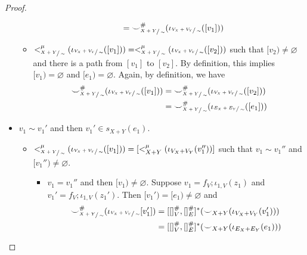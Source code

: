 \begin{proof}
\begin{itemize}
\begin{itemize}
\begin{itemize}
\begin{align*}
                                                                                                            &= {\smile}_{\sfrac{X+Y}{\sim}}^{{\#}}(\iota_{\sfrac{V_{X} + V_{Y}}{\sim}}([v_1]))
                    \end{align*}
                \end{itemize}
                \item $<_{\sfrac{X+Y}{\sim}}^{\mu}(\iota_{\sfrac{V_{X} + V_{Y}}{\sim}}([v_1])) = <_{\sfrac{X+Y}{\sim}}^{\mu}(\iota_{\sfrac{V_{X} + V_{Y}}{\sim}}([v_2]))$ such that $[v_2) \not = \varnothing$ and there is a path from $[v_1]$ to $[v_2]$. 
                By definition, this implies $[v_1) = \varnothing$ and $[e_1) = \varnothing$.
                Again, by definition, we have
                \begin{align*}
                    {\smile}_{\sfrac{X+Y}{\sim}}^{{\#}}(\iota_{\sfrac{V_{X} + V_{Y}}{\sim}}([v_1])) &= {\smile}_{\sfrac{X+Y}{\sim}}^{{\#}}(\iota_{\sfrac{V_{X} + V_{Y}}{\sim}}([v_2]))\\
                                                                                                    &= {\smile}_{\sfrac{X+Y}{\sim}}^{{\#}}(\iota_{\sfrac{E_{X} + E_{Y}}{\sim}}([e_1]))
                \end{align*}
                \end{itemize}
                \item $v_1 \sim v_1'$ and then $v_1' \in s_{X+Y}(e_1)$.
                \begin{itemize}
                    \item $<_{\sfrac{X+Y}{\sim}}^{\mu}(\iota_{\sfrac{V_{X} + V_{Y}}{\sim}}([v_1])) = [<_{X+Y}^{\mu}(\iota_{V_{X} + V_{Y}}(v_1''))]$ such that $v_1 \sim v_1''$ and $[v_1'') \not = \varnothing$.
                    \begin{itemize}
                        \item $v_1 = v_1''$ and then $[v_1) \not = \varnothing$.
                              Suppose $v_1 = f_{V};\iota_{1,V}(z_1)$ and $v_1' = f_{V};\iota_{1,V}(z_1')$. Then $[v_1') = [e_1) \not = \varnothing$ and 
                            \begin{align*}
                              \consistency_{\sfrac{X+Y}{\sim}}^{\hashtag}(\iota_{\sfrac{V_{X} + V_{Y}}{\sim}}[v_1']) &= [[]_{V}^{\hashtag},[]_{E}^{\hashtag}]^{*}(\consistency_{X+Y}(\iota_{V_{X} + V_{Y}}(v_1')))\\
                                                                                                                     &= [[]_{V}^{\hashtag},[]_{E}^{\hashtag}]^{*}(\consistency_{X+Y}(\iota_{E_{X} + E_{Y}}(e_1)))\\

\end{align*}
\end{itemize}
\end{itemize}
\end{itemize}
\end{proof}
